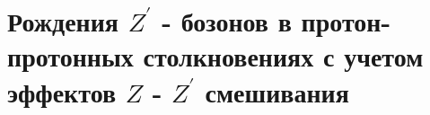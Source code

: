 \chapter{Рождения $ Z^\prime $ - бозонов в протон-протонных столкновениях с учетом эффектов $ Z $ - $ Z^\prime $ смешивания}



